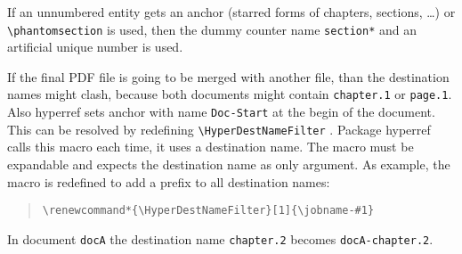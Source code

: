 \documentclass{article}
\newcommand*{\cs}[1]{%
  \texttt{\textbackslash #1}%
}
\newcommand*{\xpackage}[1]{\textsf{#1}}
\begin{document}
If an unnumbered entity gets an anchor (starred forms of
chapters, sections, \dots) or \cs{phantomsection} is used,
then the dummy counter name \texttt{section*} and an artificial
unique number is used.

If the final PDF file is going to be merged with another file, than
the destination names might clash, because both documents might
contain \texttt{chapter.1} or \texttt{page.1}. Also \xpackage{hyperref}
sets anchor with name \texttt{Doc-Start} at the begin of the document.
This can be resolved by redefining \cs{HyperDestNameFilter}.
Package \xpackage{hyperref} calls this macro each time, it uses a
destination name.
The macro must be expandable and expects the destination name
as only argument. As example, the macro is redefined to add
a prefix to all destination names:
\begin{quote}
\begin{verbatim}
\renewcommand*{\HyperDestNameFilter}[1]{\jobname-#1}
\end{verbatim}
\end{quote}
In document \texttt{docA} the destination name \texttt{chapter.2}
becomes \texttt{docA-chapter.2}.
\end{document}
